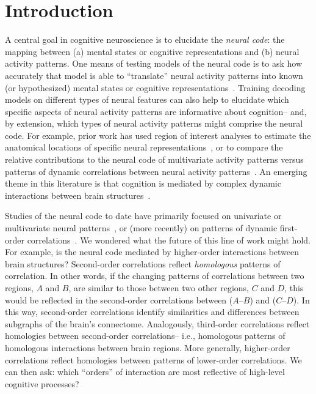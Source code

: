 \documentclass[english]{article}
\begin{document}
\section*{Introduction}
A central goal in cognitive neuroscience is to elucidate the
\textit{neural code}: the mapping between (a) mental states or
cognitive representations and (b) neural activity patterns. One means
of testing models of the neural code is to ask how accurately that
model is able to ``translate'' neural activity patterns into known (or
hypothesized) mental states or cognitive
representations~\citep[e.g.,][]{HaxbEtal01, NormEtal06, TongPrat12,
  MitcEtal08a, KamiTong05, NishEtal11, PereEtal18, HuthEtal12,
  HuthEtal16}.  Training decoding models on different types of neural
features can also help to elucidate which specific aspects of neural
activity patterns are informative about cognition-- and, by extension,
which types of neural activity patterns might comprise the neural
code.  For example, prior work has used region of interest analyses to
estimate the anatomical locations of specific neural
representations~\citep[e.g.,][]{EtzeEtal09}, or to compare the
relative contributions to the neural code of multivariate activity
patterns versus patterns of dynamic correlations between neural
activity patterns~\citep[e.g.,][]{MannEtal18, FongEtal19}.  An
emerging theme in this literature is that cognition is mediated by
complex dynamic interactions between brain
structures~\citep{SporHone06, BassEtal06, Turk13, DemeEtal19}.

Studies of the neural code to date have primarily focused on
univariate or multivariate neural patterns~\citep[for review
see][]{NormEtal06}, or (more recently) on patterns of dynamic
first-order correlations~\citep[i.e., interactions between pairs of
brain structures;][]{MannEtal18, FongEtal19}.  We wondered what the
future of this line of work might hold.  For example, is the neural
code mediated by higher-order interactions between brain structures?
Second-order correlations reflect \textit{homologous} patterns of
correlation.  In other words, if the changing patterns of correlations
between two regions, $A$ and $B$, are similar to those between two
other regions, $C$ and $D$, this would be reflected in the
second-order correlations between ($A$--$B$) and ($C$--$D$).  In this
way, second-order correlations identify similarities and differences
between subgraphs of the brain's connectome.  Analogously, third-order
correlations reflect homologies between second-order correlations--
i.e., homologous patterns of homologous interactions between brain
regions.  More generally, higher-order correlations reflect homologies
between patterns of lower-order correlations.  We can then ask: which
``orders'' of interaction are most reflective of high-level cognitive
processes?
\end{document}
